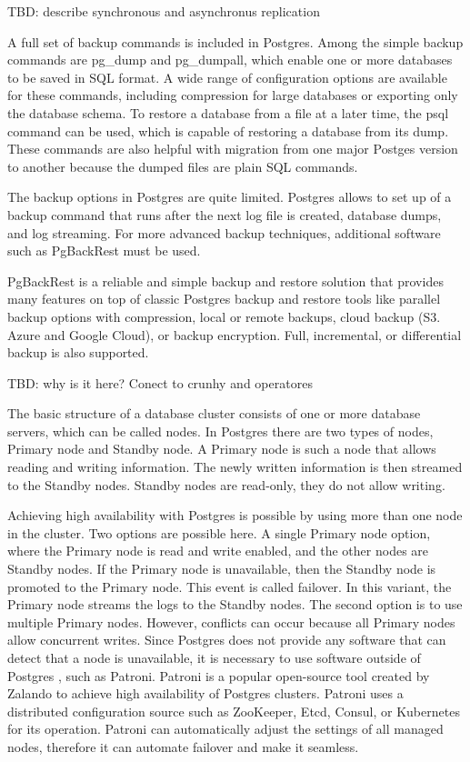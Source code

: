 TBD: describe synchronous and asynchronus replication

A full set of backup commands is included in Postgres. Among the simple backup commands are pg\_dump and pg\_dumpall, which enable one or more databases to be saved in SQL format. A wide range of configuration options are available for these commands, including compression for large databases or exporting only the database schema. To restore a database from a file at a later time, the psql command can be used, which is capable of restoring a database from its dump. \cite{DocuPgDump} These commands are also helpful with migration from one major Postges version to another because the dumped files are plain SQL commands.

The backup options in Postgres are quite limited. Postgres allows to set up of a backup command that runs after the next log file is created, database dumps, and log streaming. For more advanced backup techniques, additional software such as PgBackRest must be used. \cite{DocuPgPITR}

PgBackRest is a reliable and simple backup and restore solution that provides many features on top of classic Postgres backup and restore tools like parallel backup options with compression, local or remote backups, cloud backup (S3. Azure and Google Cloud), or backup encryption. Full, incremental, or differential backup is also supported. \cite{PGbackRest}

TBD: why is it here? Conect to crunhy and operatores


The basic structure of a database cluster consists of one or more database servers, which can be called nodes. In Postgres there are two types of nodes, Primary node and Standby node.  A Primary node is such a node that allows reading and writing information. The newly written information is then streamed to the Standby nodes. Standby nodes are read-only, they do not allow writing. \cite{pg14replication}

Achieving high availability with Postgres is possible by using more than one node in the cluster. Two options are possible here. A single Primary node option, where the Primary node is read and write enabled, and the other nodes are Standby nodes. If the Primary node is unavailable, then the Standby node is promoted to the Primary node. This event is called failover. In this variant, the Primary node streams the logs to the Standby nodes. The second option is to use multiple Primary nodes. However, conflicts can occur because all Primary nodes allow concurrent writes. \cite{docuPgHA}
Since Postgres does not provide any software that can detect that a node is unavailable, it is necessary to use software outside of Postgres \cite{docuPgFailover}, such as Patroni.
Patroni is a popular open-source tool created by Zalando to achieve high availability of Postgres clusters. Patroni uses a distributed configuration source such as ZooKeeper, Etcd, Consul, or Kubernetes for its operation. Patroni can automatically adjust the settings of all managed nodes, therefore it can automate failover and make it seamless. \cite{PalarkMigratingPg} \cite{PatroniDocu}


